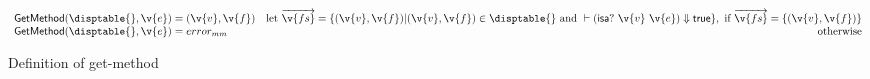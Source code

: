\begin{figure*}
$$
\begin{array}{lr}

  \getmethod {\disptable{}}
             {\v{e}}
             {\roundpair{\v{v}}{\v{f}}}

             & 
             \text{let } {\overrightarrow{\v{fs}}} = 
                \{ (\v{v}, \v{f}) | 
                    {\roundpair{\v{v}}{\v{f}}} \in \disptable{} 
                  \text{ and } 
                    \opsem{}{\isaapp{\v{v}}{\v{e}}}{\true{}} \}, 
             \text{ if } {\overrightarrow{\v{fs}}} = \{{\roundpair{\v{v}}{\v{f}}}\}

             \\
  \getmethod {\disptable{}}
             {\v{e}}
             {\mmerror{}} & \text{otherwise}

\end{array}
$$
\caption{Definition of get-method}
\end{figure*}

